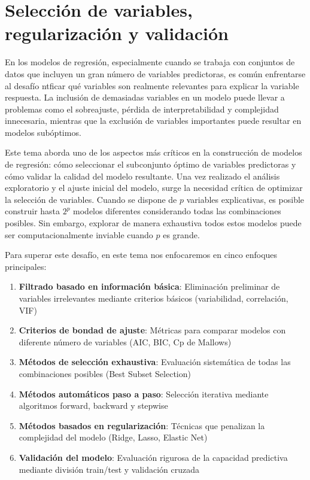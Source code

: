 \documentclass[
  letterpaper,
  DIV=11,
  numbers=noendperiod]{scrreprt}
\begin{document}

\chapter{Selección de variables, regularización y
validación}\label{sec-tema2}

En los modelos de regresión, especialmente cuando se trabaja con
conjuntos de datos que incluyen un gran número de variables predictoras,
es común enfrentarse al desafío ntficar qué variables son realmente
relevantes para explicar la variable respuesta. La inclusión de
demasiadas variables en un modelo puede llevar a problemas como el
sobreajuste, pérdida de interpretabilidad y complejidad innecesaria,
mientras que la exclusión de variables importantes puede resultar en
modelos subóptimos.

Este tema aborda uno de los aspectos más críticos en la construcción de
modelos de regresión: cómo seleccionar el subconjunto óptimo de
variables predictoras y cómo validar la calidad del modelo resultante.
Una vez realizado el análisis exploratorio y el ajuste inicial del
modelo, surge la necesidad crítica de optimizar la selección de
variables. Cuando se dispone de \(p\) variables explicativas, es posible
construir hasta \(2^p\) modelos diferentes considerando todas las
combinaciones posibles. Sin embargo, explorar de manera exhaustiva todos
estos modelos puede ser computacionalmente inviable cuando \(p\) es
grande.

Para superar este desafío, en este tema nos enfocaremos en cinco
enfoques principales:

\begin{enumerate}
\def\labelenumi{\arabic{enumi}.}
\item
  \textbf{Filtrado basado en información básica}: Eliminación preliminar
  de variables irrelevantes mediante criterios básicos (variabilidad,
  correlación, VIF)
\item
  \textbf{Criterios de bondad de ajuste}: Métricas para comparar modelos
  con diferente número de variables (AIC, BIC, Cp de Mallows)
\item
  \textbf{Métodos de selección exhaustiva}: Evaluación sistemática de
  todas las combinaciones posibles (Best Subset Selection)
\item
  \textbf{Métodos automáticos paso a paso}: Selección iterativa mediante
  algoritmos forward, backward y stepwise
\item
  \textbf{Métodos basados en regularización}: Técnicas que penalizan la
  complejidad del modelo (Ridge, Lasso, Elastic Net)
\item
  \textbf{Validación del modelo}: Evaluación rigurosa de la capacidad
  predictiva mediante división train/test y validación cruzada
\end{enumerate}
\end{document}
